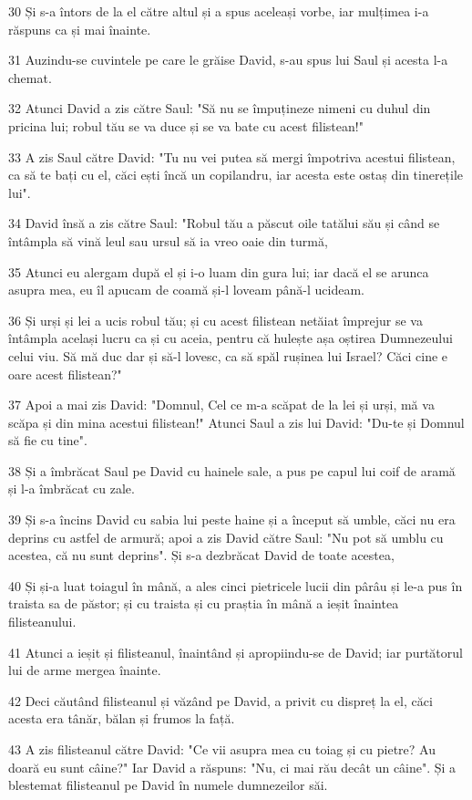 \par 30 Și s-a întors de la el către altul și a spus aceleași vorbe, iar mulțimea i-a răspuns ca și mai înainte.
\par 31 Auzindu-se cuvintele pe care le grăise David, s-au spus lui Saul și acesta l-a chemat.
\par 32 Atunci David a zis către Saul: "Să nu se împuțineze nimeni cu duhul din pricina lui; robul tău se va duce și se va bate cu acest filistean!"
\par 33 A zis Saul către David: "Tu nu vei putea să mergi împotriva acestui filistean, ca să te bați cu el, căci ești încă un copilandru, iar acesta este ostaș din tinerețile lui".
\par 34 David însă a zis către Saul: "Robul tău a păscut oile tatălui său și când se întâmpla să vină leul sau ursul să ia vreo oaie din turmă,
\par 35 Atunci eu alergam după el și i-o luam din gura lui; iar dacă el se arunca asupra mea, eu îl apucam de coamă și-l loveam până-l ucideam.
\par 36 Și urși și lei a ucis robul tău; și cu acest filistean netăiat împrejur se va întâmpla același lucru ca și cu aceia, pentru că hulește așa oștirea Dumnezeului celui viu. Să mă duc dar și să-l lovesc, ca să spăl rușinea lui Israel? Căci cine e oare acest filistean?"
\par 37 Apoi a mai zis David: "Domnul, Cel ce m-a scăpat de la lei și urși, mă va scăpa și din mina acestui filistean!" Atunci Saul a zis lui David: "Du-te și Domnul să fie cu tine".
\par 38 Și a îmbrăcat Saul pe David cu hainele sale, a pus pe capul lui coif de aramă și l-a îmbrăcat cu zale.
\par 39 Și s-a încins David cu sabia lui peste haine și a început să umble, căci nu era deprins cu astfel de armură; apoi a zis David către Saul: "Nu pot să umblu cu acestea, că nu sunt deprins". Și s-a dezbrăcat David de toate acestea,
\par 40 Și și-a luat toiagul în mână, a ales cinci pietricele lucii din pârâu și le-a pus în traista sa de păstor; și cu traista și cu praștia în mână a ieșit înaintea filisteanului.
\par 41 Atunci a ieșit și filisteanul, înaintând și apropiindu-se de David; iar purtătorul lui de arme mergea înainte.
\par 42 Deci căutând filisteanul și văzând pe David, a privit cu dispreț la el, căci acesta era tânăr, bălan și frumos la față.
\par 43 A zis filisteanul către David: "Ce vii asupra mea cu toiag și cu pietre? Au doară eu sunt câine?" Iar David a răspuns: "Nu, ci mai rău decât un câine". Și a blestemat filisteanul pe David în numele dumnezeilor săi.
